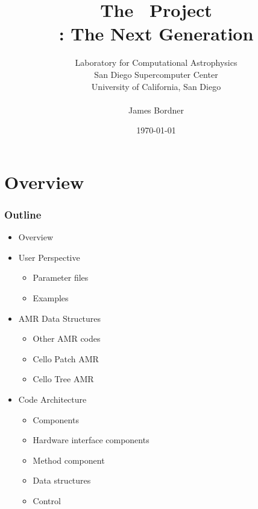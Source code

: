 \documentclass{beamer}
\title[The \cello\ Project]
      {The \cello\ Project \\ \small{\enzo: The Next Generation}}
\author[James Bordner]{\small Laboratory for Computational Astrophysics \\ San Diego Supercomputer Center \\ University of California, San Diego \\ \ \\ James Bordner}
\date{\today}
\begin{document}
\frame{\titlepage}
\frame{\tableofcontents}



\section{Overview}
    \begin{frame}[fragile] \frametitle{Outline}
      \begin{itemize}
        \item Overview
        \item User Perspective
        \begin{itemize}
          \item Parameter files
          \item Examples
        \end{itemize}
        \item AMR Data Structures
        \begin{itemize}
          \item Other AMR codes
          \item Cello Patch AMR
          \item Cello Tree AMR
        \end{itemize}
        \item Code Architecture
        \begin{itemize}
          \item Components
          \item Hardware interface components
          \item Method component
          \item Data structures
          \item Control
        \end{itemize}
      \end{itemize}
\end{frame}
\end{document}
